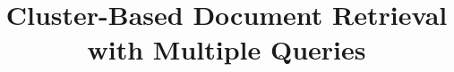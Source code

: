 \documentclass[sigconf,natbib=true,anonymous=true]{acmart}
\title{Cluster-Based Document Retrieval with Multiple Queries}
\begin{document}

\maketitle





\balance


\end{document}
